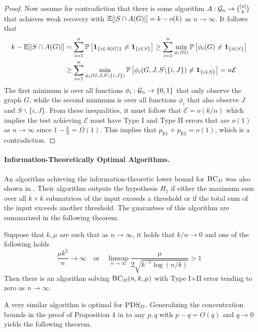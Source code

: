 \begin{proof}
Now assume for contradiction that there is some algorithm $A : \mathcal{G}_n \to \binom{[n]}{k}$ that achieves weak recovery with $\mathbb{E}[|S \cap A(G)|] = k - o(k)$ as $n \to \infty$. It follows that
\begin{align*}
k - \mathbb{E}[|S \cap A(G)|] &= \sum_{i = 1}^n \mathbb{P}\left[ \mathbf{1}_{\{i \in A(G)\}} \neq \mathbf{1}_{\{i \in S\}} \right] \ge \sum_{i = 1}^n \min_{\phi_i(G)} \mathbb{P}\left[ \phi_i(G) \neq \mathbf{1}_{\{i \in S\}} \right] \\
&\ge \sum_{i = 1}^n \min_{\phi_i(G, J, S\backslash \{i, J\})} \mathbb{P}\left[ \phi_i(G, J, S\backslash \{i, J\}) \neq \mathbf{1}_{\{i \in S\}} \right] = n \mathcal{E}
\end{align*}
The first minimum is over all functions $\phi_i : \mathcal{G}_n \to \{0, 1\}$ that only observe the graph $G$, while the second minimum is over all functions $\phi_i$ that also observe $J$ and $S \backslash \{i, J\}$. From these inequalities, it must follow that $\mathcal{E} = o(k/n)$ which implies the test achieving $\mathcal{E}$ must have Type I and Type II errors that are $o(1)$ as $n \to \infty$ since $1 - \frac{k}{n} = \Omega(1)$. This implies that $p_{\text{E1}} + p_{\text{E2}} = o(1)$, which is a contradiction.
\end{proof}

\paragraph{Information-Theoretically Optimal Algorithms.} An algorithm achieving the information-theoretic lower bound for $\textsc{BC}_D$ was also shown in \cite{butucea2013detection}. Their algorithm outputs the hypothesis $H_1$ if either the maximum sum over all $k \times k$ submatrices of the input exceeds a threshold or if the total sum of the input exceeds another threshold. The guarantees of this algorithm are summarized in the following theorem.

\begin{theorem}
Suppose that $k, \mu$ are such that as $n \to \infty$, it holds that $k/n \to 0$ and one of the following holds
$$\frac{\mu k^2}{n} \to \infty \quad \text{or} \quad \limsup_{n \to \infty} \frac{\mu}{2\sqrt{k^{-1} \log(n/k)}} > 1$$
Then there is an algorithm solving $\textsc{BC}_D(n, k, \mu)$ with Type I$+$II error tending to zero as $n \to \infty$.
\end{theorem}

A very similar algorithm is optimal for $\textsc{PDS}_D$. Generalizing the concentration bounds in the proof of Proposition 4 in \cite{hajek2015computational} to any $p, q$ with $p - q = O(q)$ and $q \to 0$ yields the following theorem.

